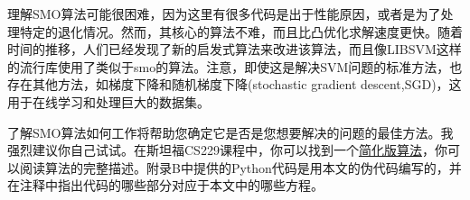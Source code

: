 理解SMO算法可能很困难，因为这里有很多代码是出于性能原因，或者是为了处理特定的退化情况。然而，其核心的算法不难，而且比凸优化求解速度更快。随着时间的推移，人们已经发现了新的启发式算法来改进该算法，而且像LIBSVM这样的流行库使用了类似于smo的算法。注意，即使这是解决SVM问题的标准方法，也存在其他方法，如梯度下降和随机梯度下降(stochastic gradient descent,SGD)，这用于在线学习和处理巨大的数据集。

了解SMO算法如何工作将帮助您确定它是否是您想要解决的问题的最佳方法。我强烈建议你自己试试。在斯坦福CS229课程中，你可以找到一个\href{http://cs229.stanford.edu/materials/smo.pdf)的描述，这是一个很好的开始。然后，在序列最小化(Platt J. C.， 1998}{简化版算法}，你可以阅读算法的完整描述。附录B中提供的Python代码是用本文的伪代码编写的，并在注释中指出代码的哪些部分对应于本文中的哪些方程。